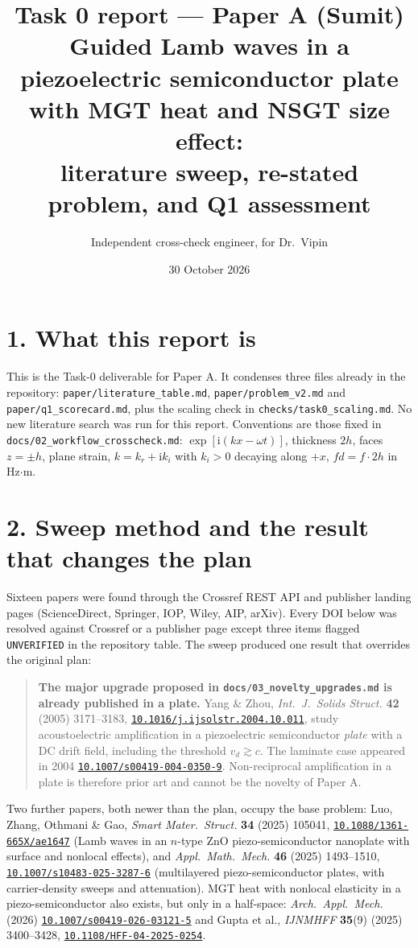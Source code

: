 \documentclass[11pt]{article}
\title{\vspace{-1.2cm}\textbf{Task 0 report --- Paper A (Sumit)}\\[2pt]
\large Guided Lamb waves in a piezoelectric semiconductor plate with MGT heat and NSGT size effect:\\
literature sweep, re-stated problem, and Q1 assessment}
\author{Independent cross-check engineer, for Dr.\ Vipin}
\date{30 October 2026}
\newcommand{\doi}[1]{\href{https://doi.org/#1}{\texttt{#1}}}
\begin{document}
\maketitle
\vspace{-0.5cm}

\section*{1. What this report is}
This is the Task-0 deliverable for Paper A. It condenses three files already in the repository:
\texttt{paper/literature\_table.md}, \texttt{paper/problem\_v2.md} and \texttt{paper/q1\_scorecard.md},
plus the scaling check in \texttt{checks/task0\_scaling.md}. No new literature search was run for
this report. Conventions are those fixed in \texttt{docs/02\_workflow\_crosscheck.md}:
$\exp[\mathrm{i}(kx-\omega t)]$, thickness $2h$, faces $z=\pm h$, plane strain,
$k=k_r+\mathrm{i}k_i$ with $k_i>0$ decaying along $+x$, $fd=f\cdot 2h$ in Hz$\cdot$m.

\section*{2. Sweep method and the result that changes the plan}
Sixteen papers were found through the Crossref REST API and publisher landing pages
(ScienceDirect, Springer, IOP, Wiley, AIP, arXiv). Every DOI below was resolved against Crossref
or a publisher page except three items flagged \texttt{UNVERIFIED} in the repository table.
The sweep produced one result that overrides the original plan:

\begin{quote}
\textbf{The major upgrade proposed in \texttt{docs/03\_novelty\_upgrades.md} is already published
in a plate.} Yang \& Zhou, \emph{Int.\ J.\ Solids Struct.} \textbf{42} (2005) 3171--3183,
\doi{10.1016/j.ijsolstr.2004.10.011}, study acoustoelectric amplification in a piezoelectric
semiconductor \emph{plate} with a DC drift field, including the threshold $v_d\gtrsim c$.
The laminate case appeared in 2004 \doi{10.1007/s00419-004-0350-9}. Non-reciprocal amplification
in a plate is therefore prior art and cannot be the novelty of Paper A.
\end{quote}

Two further papers, both newer than the plan, occupy the base problem: Luo, Zhang, Othmani \& Gao,
\emph{Smart Mater.\ Struct.} \textbf{34} (2025) 105041, \doi{10.1088/1361-665X/ae1647}
(Lamb waves in an $n$-type ZnO piezo-semiconductor nanoplate with surface and nonlocal effects),
and \emph{Appl.\ Math.\ Mech.} \textbf{46} (2025) 1493--1510, \doi{10.1007/s10483-025-3287-6}
(multilayered piezo-semiconductor plates, with carrier-density sweeps and attenuation).
MGT heat with nonlocal elasticity in a piezo-semiconductor also exists, but only in a half-space:
\emph{Arch.\ Appl.\ Mech.} (2026) \doi{10.1007/s00419-026-03121-5} and
Gupta et al., \emph{IJNMHFF} \textbf{35}(9) (2025) 3400--3428, \doi{10.1108/HFF-04-2025-0254}.
\end{document}
